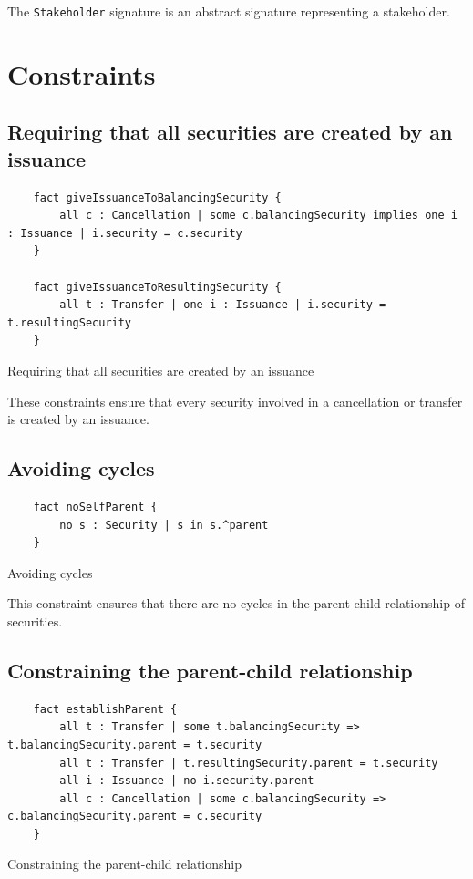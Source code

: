 The \texttt{Stakeholder} signature is an abstract signature representing a stakeholder.

\section{Constraints}

\subsection{Requiring that all securities are created by an issuance}
\begin{listing}[!h]
\begin{verbatim}
	fact giveIssuanceToBalancingSecurity {
		all c : Cancellation | some c.balancingSecurity implies one i : Issuance | i.security = c.security
	}
	
	fact giveIssuanceToResultingSecurity {
		all t : Transfer | one i : Issuance | i.security = t.resultingSecurity
	}
\end{verbatim}
\caption{Requiring that all securities are created by an issuance}
\label{lst:issuance-constraint-1}
\end{listing}

These constraints ensure that every security involved in a cancellation or transfer is created by an issuance.

\subsection{Avoiding cycles}
\begin{listing}[!h]
\begin{verbatim}
	fact noSelfParent {
		no s : Security | s in s.^parent
	}
\end{verbatim}
\caption{Avoiding cycles}
\label{lst:no-self-parent-constraint-1}
\end{listing}

This constraint ensures that there are no cycles in the parent-child relationship of securities.

\subsection{Constraining the parent-child relationship}
\begin{listing}[!h]
\begin{verbatim}
	fact establishParent {
		all t : Transfer | some t.balancingSecurity => t.balancingSecurity.parent = t.security
		all t : Transfer | t.resultingSecurity.parent = t.security
		all i : Issuance | no i.security.parent
		all c : Cancellation | some c.balancingSecurity => c.balancingSecurity.parent = c.security
	}
\end{verbatim}
\caption{Constraining the parent-child relationship}
\label{lst:establish-parent-constraint-1}
\end{listing}

